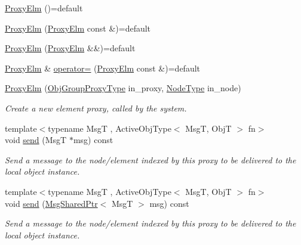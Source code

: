 \begin{DoxyCompactItemize}
\item 
\hyperlink{structvt_1_1objgroup_1_1proxy_1_1_proxy_elm_ad610547c98659b9d34a6dca416a4d319}{Proxy\+Elm} ()=default
\item 
\hyperlink{structvt_1_1objgroup_1_1proxy_1_1_proxy_elm_a50590ebf12e4ae89fc140583412d05b0}{Proxy\+Elm} (\hyperlink{structvt_1_1objgroup_1_1proxy_1_1_proxy_elm}{Proxy\+Elm} const \&)=default
\item 
\hyperlink{structvt_1_1objgroup_1_1proxy_1_1_proxy_elm_aa3feddfc8142ae38f9436ce3ff86efb7}{Proxy\+Elm} (\hyperlink{structvt_1_1objgroup_1_1proxy_1_1_proxy_elm}{Proxy\+Elm} \&\&)=default
\item 
\hyperlink{structvt_1_1objgroup_1_1proxy_1_1_proxy_elm}{Proxy\+Elm} \& \hyperlink{structvt_1_1objgroup_1_1proxy_1_1_proxy_elm_a9211613f646a4f3d215cf1d9e76219db}{operator=} (\hyperlink{structvt_1_1objgroup_1_1proxy_1_1_proxy_elm}{Proxy\+Elm} const \&)=default
\item 
\hyperlink{structvt_1_1objgroup_1_1proxy_1_1_proxy_elm_a59a010b3f1428a77cb12a9806028f399}{Proxy\+Elm} (\hyperlink{namespacevt_ad7cae989df485fccca57f0792a880a8e}{Obj\+Group\+Proxy\+Type} in\+\_\+proxy, \hyperlink{namespacevt_a866da9d0efc19c0a1ce79e9e492f47e2}{Node\+Type} in\+\_\+node)
\begin{DoxyCompactList}\small\item\em Create a new element proxy, called by the system. \end{DoxyCompactList}\item 
{\footnotesize template$<$typename MsgT , Active\+Obj\+Type$<$ Msg\+T, Obj\+T $>$ fn$>$ }\\void \hyperlink{structvt_1_1objgroup_1_1proxy_1_1_proxy_elm_a64d85f6d2721f2001e1e9ecb910e34f9}{send} (MsgT $\ast$msg) const
\begin{DoxyCompactList}\small\item\em Send a message to the node/element indexed by this proxy to be delivered to the local object instance. \end{DoxyCompactList}\item 
{\footnotesize template$<$typename MsgT , Active\+Obj\+Type$<$ Msg\+T, Obj\+T $>$ fn$>$ }\\void \hyperlink{structvt_1_1objgroup_1_1proxy_1_1_proxy_elm_ab3d1751dac7c003cd13306277c164247}{send} (\hyperlink{namespacevt_ab2b3d506ec8e8d1540aede826d84a239}{Msg\+Shared\+Ptr}$<$ MsgT $>$ msg) const
\begin{DoxyCompactList}\small\item\em Send a message to the node/element indexed by this proxy to be delivered to the local object instance. \end{DoxyCompactList}\item 

\end{DoxyCompactItemize}

